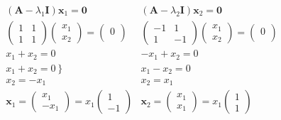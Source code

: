 \documentclass[12pt]{article}
\begin{document}
\begin{equation*}
	\begin{array}{r}
		\left(\mathbf{A}-\lambda_{1} \mathbf{I}\right) \mathbf{x}_{1}=\mathbf{0}                                            & \left(\mathbf{A}-\lambda_{2} \mathbf{I}\right) \mathbf{x}_{2}=\mathbf{0}                                            \\
		\left(\begin{array}{ll}
				1 & 1 \\
				1 & 1
			\end{array}\right)\left(\begin{array}{l}
				x_{1} \\
				x_{2}
			\end{array}\right)=\left(\begin{array}{l}
				0 \\

			\end{array}\right) & \left(\begin{array}{cc}
				-1 & 1  \\
				1  & -1
			\end{array}\right)\left(\begin{array}{l}
				x_{1} \\
				x_{2}
			\end{array}\right)=\left(\begin{array}{l}
				0 \\

			\end{array}\right) \\
		x_{1}+x_{2}=0                                                                                                       & -x_{1}+x_{2}=0                                                                                                      \\
		\left.x_{1}+x_{2}=0\right\}                                                                                         & x_{1}-x_{2}=0                                                                                                       \\
		x_{2}=-x_{1}                                                                                                        & x_{2}=x_{1}                                                                                                         \\
		\mathbf{x}_{1}=\left(\begin{array}{c}
				x_{1} \\
				-x_{1}
			\end{array}\right)=x_{1}\left(\begin{array}{c}
				1 \\
				-1
			\end{array}\right)                   & \mathbf{x}_{2}=\left(\begin{array}{l}
				x_{1} \\
				x_{1}
			\end{array}\right)=x_{1}\left(\begin{array}{l}
				1 \\
				1
			\end{array}\right)
	\end{array}
\end{equation*}
\end{document}
